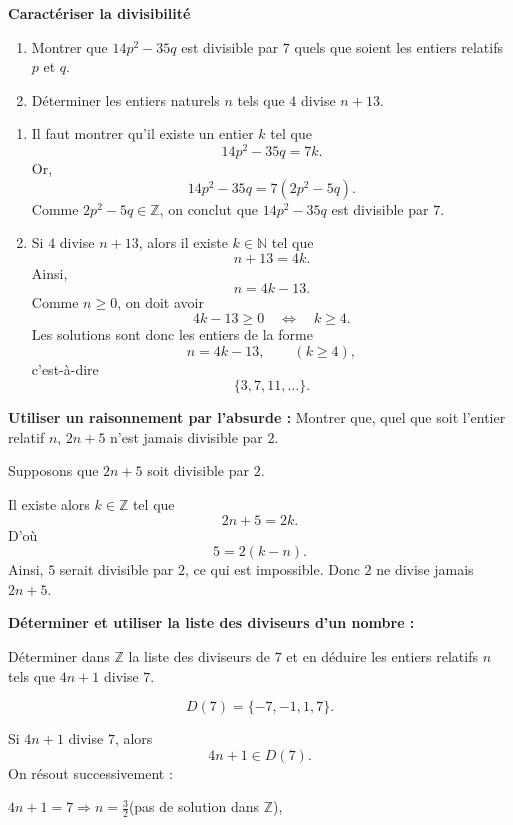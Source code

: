 	\exerciceresolu
	\textbf{Caractériser la divisibilité}

	\begin{enumerate}
		\item Montrer que $14p^2-35q$ est divisible par $7$ quels que soient les entiers relatifs $p$ et $q$.

		\item Déterminer les entiers naturels $n$ tels que $4$ divise $n+13$.
	\end{enumerate}

	\solution

	\begin{enumerate}
		\item Il faut montrer qu'il existe un entier $k$ tel que
		$$
		14p^2-35q=7k.
		$$
		Or,
		$$
		14p^2-35q=7(2p^2-5q).
		$$
		Comme $2p^2-5q\in\mathbb Z$, on conclut que $14p^2-35q$ est divisible par $7$.

		\item Si $4$ divise $n+13$, alors il existe $k\in\mathbb N$ tel que
		$$
		n+13=4k.
		$$
		Ainsi,
		$$
		n=4k-13.
		$$
		Comme $n\ge0$, on doit avoir
		$$
		4k-13\ge0
		\quad\Longleftrightarrow\quad
		k\ge4.
		$$
		Les solutions sont donc les entiers de la forme
		$$
		n=4k-13,\qquad (k\ge4),
		$$
		c'est-à-dire
		$$
		\{3,7,11,\ldots\}.
		$$

	\end{enumerate}
	\exerciceresolu

	\textbf{Utiliser un raisonnement par l'absurde : }
	Montrer que, quel que soit l'entier relatif $n$, $2n+5$ n'est jamais divisible par $2$.

	\solution
	Supposons que $2n+5$ soit divisible par $2$.

	Il existe alors $k\in\mathbb Z$ tel que
	$$
	2n+5=2k.
	$$
	D'où
	$$
	5=2(k-n).
	$$
	Ainsi, $5$ serait divisible par $2$, ce qui est impossible.
	Donc $2$ ne divise jamais $2n+5$.

	\exerciceresolu
	\textbf{Déterminer et utiliser la liste des diviseurs d'un nombre :}

	Déterminer dans $\mathbb Z$ la liste des diviseurs de $7$ et en déduire les entiers relatifs $n$ tels que $4n+1$ divise $7$.

	\solution
	$$
	D(7)=\{-7,-1,1,7\}.
	$$

	Si $4n+1$ divise $7$, alors
	$$
	4n+1\in D(7).
	$$
	On résout successivement :

	$4n+1=7 \Longrightarrow n=\frac32$(pas de solution dans $\mathbb Z$),

